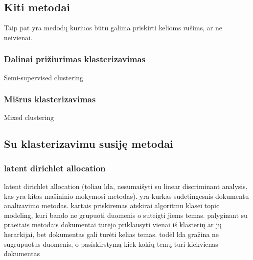 \documentclass{VUMIFInfKursinis}
\begin{document}
	\subsection{Kiti metodai}
			Taip pat yra medodų kuriuos būtu galima priskirti kelioms rušims, ar ne neivienai. 
		\subsubsection{Dalinai prižiūrimas klasterizavimas}
			Semi-supervised clustering
		\subsubsection{Mišrus klasterizavimas}
			Mixed clustering

	\subsection{Su klasterizavimu susiję metodai}

		\subsubsection{latent dirichlet allocation}
			latent dirichlet allocation (toliau lda, nesumaišyti su linear discriminant analysis, kas yra kitas mašininio mokymosi metodas). yra kurkas sudetingesnis dokumentu analizavimo metodas. kartais priskiremas atskirai algoritmu klasei topic modeling, kuri bando ne grupuoti duomenis o suteigti jiems temas. palyginant su praeitais metodais dokumentai turėjo priklausyti vienai iš klasterių ar jų herarkijai, bet dokumentas gali turėti kelias temas. 
			todėl lda gražina ne sugrupuotus duomenis, o pasiskirstymą kiek kokių temų turi kiekvienas dokumentas  
\end{document}
